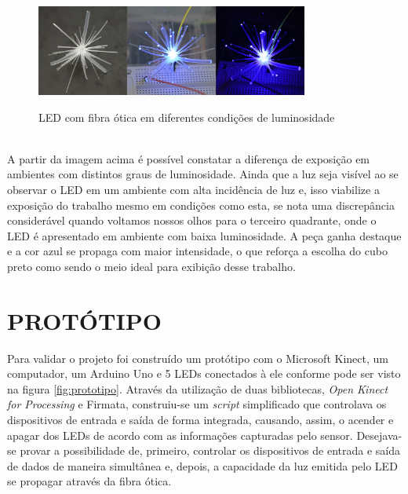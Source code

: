 \begin{figure}[H]
    \centering
    \caption{LED com fibra ótica em diferentes condições de luminosidade}
	\vspace*{0,2cm}
    \includegraphics[width=0.8\textwidth]{./04-figuras/led_fibra_otica}
    \label{fig:led_fibra_otica}
\end{figure}
\vspace*{-0,9cm}
{\raggedright {}}\\

A partir da imagem acima é possível constatar a diferença de exposição em ambientes com distintos graus de luminosidade. Ainda que a luz seja visível ao se observar o LED em um ambiente com alta incidência de luz e, isso viabilize a exposição do trabalho mesmo em condições como esta, se nota uma discrepância considerável quando voltamos nossos olhos para o terceiro quadrante, onde o LED é apresentado em ambiente com baixa luminosidade. A peça ganha destaque e a cor azul se propaga com maior intensidade, o que reforça a escolha do cubo preto como sendo o meio ideal para exibição desse trabalho.

\section{PROTÓTIPO}

Para validar o projeto foi construído um protótipo com o Microsoft Kinect, um computador, um Arduino Uno e 5 LEDs conectados à ele conforme pode ser visto na figura \ref{fig:prototipo}. Através da utilização de duas bibliotecas, \textit{Open Kinect for Processing} e Firmata, construiu-se um \textit{script} simplificado que controlava os dispositivos de entrada e saída de forma integrada, causando, assim, o acender e apagar dos LEDs de acordo com as informações capturadas pelo sensor. Desejava-se provar a possibilidade de, primeiro, controlar os dispositivos de entrada e saída de dados de maneira simultânea e, depois, a capacidade da luz emitida pelo LED se propagar através da fibra ótica.

